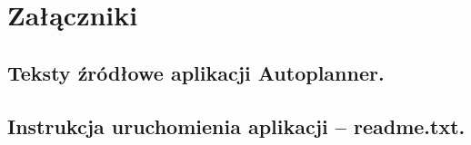 \chapter{Załączniki}
\section{Teksty źródłowe aplikacji Autoplanner.}
\section{Instrukcja uruchomienia aplikacji -- readme.txt.}
